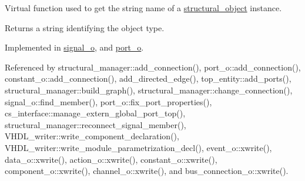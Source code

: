 Virtual function used to get the string name of a \hyperlink{classstructural__object}{structural\+\_\+object} instance. 

\begin{DoxyReturn}{Returns}
a string identifying the object type. 
\end{DoxyReturn}


Implemented in \hyperlink{classsignal__o_a66d4342659804e8d1ed84d471313fc68}{signal\+\_\+o}, and \hyperlink{structport__o_aa3aee3f5227b20c9a1175ae5875e90bf}{port\+\_\+o}.



Referenced by structural\+\_\+manager\+::add\+\_\+connection(), port\+\_\+o\+::add\+\_\+connection(), constant\+\_\+o\+::add\+\_\+connection(), add\+\_\+directed\+\_\+edge(), top\+\_\+entity\+::add\+\_\+ports(), structural\+\_\+manager\+::build\+\_\+graph(), structural\+\_\+manager\+::change\+\_\+connection(), signal\+\_\+o\+::find\+\_\+member(), port\+\_\+o\+::fix\+\_\+port\+\_\+properties(), cs\+\_\+interface\+::manage\+\_\+extern\+\_\+global\+\_\+port\+\_\+top(), structural\+\_\+manager\+::reconnect\+\_\+signal\+\_\+member(), V\+H\+D\+L\+\_\+writer\+::write\+\_\+component\+\_\+declaration(), V\+H\+D\+L\+\_\+writer\+::write\+\_\+module\+\_\+parametrization\+\_\+decl(), event\+\_\+o\+::xwrite(), data\+\_\+o\+::xwrite(), action\+\_\+o\+::xwrite(), constant\+\_\+o\+::xwrite(), component\+\_\+o\+::xwrite(), channel\+\_\+o\+::xwrite(), and bus\+\_\+connection\+\_\+o\+::xwrite().

